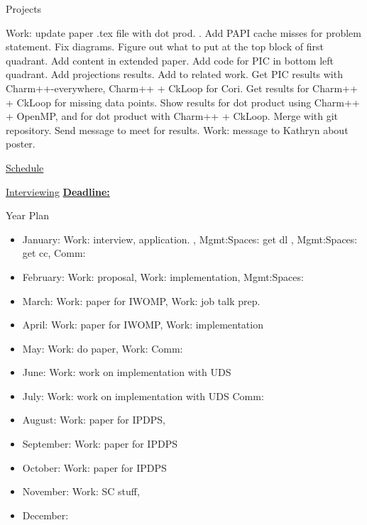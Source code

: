 \begin{columns}
\begin{column}{0.10\linewidth}
\begin{block}{Projects}
\begin{enumerate}
\ptask Work: update paper .tex file with dot prod. .
\ptask Add PAPI cache misses for problem statement.
\ptask Fix diagrams.
\ptask Figure out what to put at the top block of first quadrant.
\ptask Add content in extended paper.
\ptask Add code for PIC in bottom left quadrant.
\ptask Add projections results.
\ptask Add to related work.
\ptask Get PIC results with Charm++-everywhere, Charm++ + CkLoop for Cori.
\ptask Get results for Charm++ + CkLoop for missing data points.
\ptask Show results for dot product using Charm++ + OpenMP, and for
dot product with Charm++ + CkLoop.
\pitem Merge with git repository.
\pitem Send message to meet for results.
\pitem Work: message to Kathryn about poster.
\end{enumerate}

\underline{Schedule} \\ 
\begin{enumerate}
\pitem 
\end{enumerate} 
\end{block} 

\underline{Interviewing} 
\underline{\textbf{Deadline:}    }  
\begin{enumerate}
\pitem 
\pitem 
\end{enumerate} 


\begin{block}{Year Plan}
\begin{itemize}
\tiny \item \tiny January: Work: interview, application. , Mgmt:Spaces: get dl , Mgmt:Spaces: get cc, Comm: 
\item \tiny February: Work: proposal, Work: implementation, Mgmt:Spaces: 
\item \tiny March: Work: paper for IWOMP, Work: job talk prep.
\item \tiny April: Work: paper for IWOMP, Work: implementation  
\item \tiny May: Work: do paper, Work: Comm: 
\item \tiny June: Work: work on implementation with UDS 
\item \tiny July: Work: work on implementation with UDS Comm:  
\item \tiny August: Work: paper for IPDPS, 
\item \tiny September: Work: paper for IPDPS 
\item \tiny October: Work: paper for IPDPS  
\item \tiny November: Work: SC stuff, 
\item \tiny December: 
\end{itemize} 
\end{block}



\end{column}
\end{columns}
